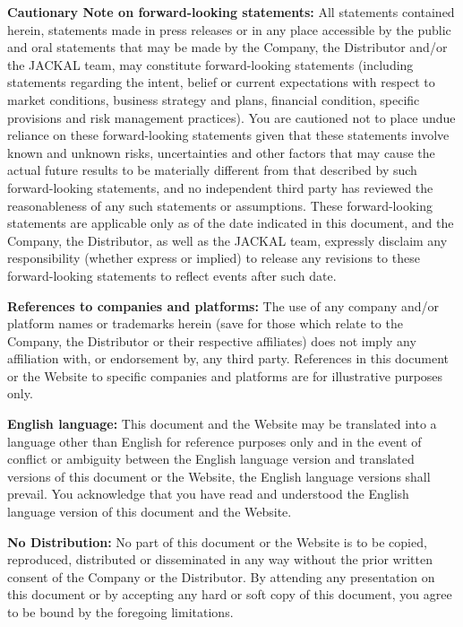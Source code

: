 \documentclass[11pt, nofootinbib]{article}
\begin{document}
{\textbf{Cautionary Note on forward-looking statements:} All statements contained herein, statements made in press releases or in any place accessible by the public and oral
statements that may be made by the Company, the Distributor and/or the JACKAL team, may constitute forward-looking statements (including statements regarding the intent,
belief or current expectations with respect to market conditions, business strategy and plans, financial condition, specific provisions and risk management practices). You are
cautioned not to place undue reliance on these forward-looking statements given that these statements involve known and unknown risks, uncertainties and other factors that
may cause the actual future results to be materially different from that described by such forward-looking statements, and no independent third party has reviewed the
reasonableness of any such statements or assumptions. These forward-looking statements are applicable only as of the date indicated in this document, and the Company,
the Distributor, as well as the JACKAL team, expressly disclaim any responsibility (whether express or implied) to release any revisions to these forward-looking statements to
reflect events after such date.\newline

\textbf{References to companies and platforms:} The use of any company and/or platform names or trademarks herein (save for those which relate to the Company, the Distributor
or their respective affiliates) does not imply any affiliation with, or endorsement by, any third party. References in this document or the Website to specific companies and
platforms are for illustrative purposes only.\newline

\textbf{English language:} This document and the Website may be translated into a language other than English for reference purposes only and in the event of conflict or ambiguity
between the English language version and translated versions of this document or the Website, the English language versions shall prevail. You acknowledge that you have
read and understood the English language version of this document and the Website.\newline

\textbf{No Distribution:} No part of this document or the Website is to be copied, reproduced, distributed or disseminated in any way without the prior written consent of the Company
or the Distributor. By attending any presentation on this document or by accepting any hard or soft copy of this document, you agree to be bound by the foregoing limitations.
}
\end{document}
